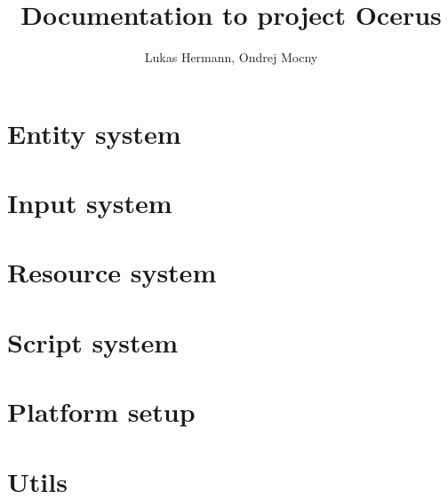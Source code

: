 \documentclass[a4paper, 12pt]{report}
\begin{document}
\pagestyle{empty} %

\title{Documentation to project Ocerus}
\author{Lukas Hermann, Ondrej Mocny}
\maketitle

\tableofcontents %
\cleardoublepage %

\pagestyle{plain} %

\chapter{Entity system}



\chapter{Input system}



\chapter{Resource system}



\chapter{Script system}



\chapter{Platform setup}



\chapter{Utils}



\end{document}
